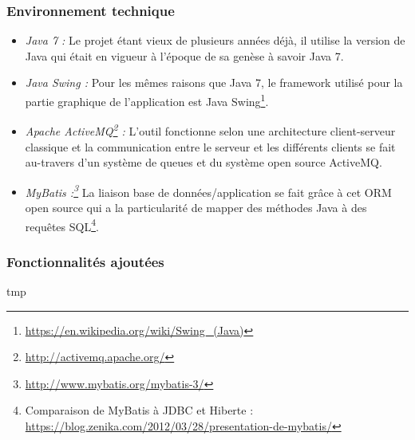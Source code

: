 \subsubsection{Environnement technique}
\begin{itemize}[label=$\bullet$]
\item \emph{Java 7 :} Le projet étant vieux de plusieurs années déjà, il utilise la version de Java qui était en vigueur à l'époque de sa genèse à savoir Java 7.
\item \emph{Java Swing :} Pour les mêmes raisons que Java 7, le framework utilisé pour la partie graphique de l'application est Java Swing\footnote{\url{https://en.wikipedia.org/wiki/Swing_(Java)}}.
\item \emph{Apache ActiveMQ\footnote{\url{http://activemq.apache.org/}} :} L'outil fonctionne selon une architecture client-serveur classique et la communication entre le serveur et les différents clients se fait au-travers d'un système de queues et du système open source ActiveMQ.
\item \emph{MyBatis :\footnote{\url{http://www.mybatis.org/mybatis-3/}}} La liaison base de données/application se fait grâce à cet ORM open source qui a la particularité de mapper des méthodes Java à des requêtes SQL\footnote{Comparaison de MyBatis à JDBC et Hiberte : \url{https://blog.zenika.com/2012/03/28/presentation-de-mybatis/}}.
\end{itemize}

\subsubsection{Fonctionnalités ajoutées}
\label{subsec:ajout}
tmp
